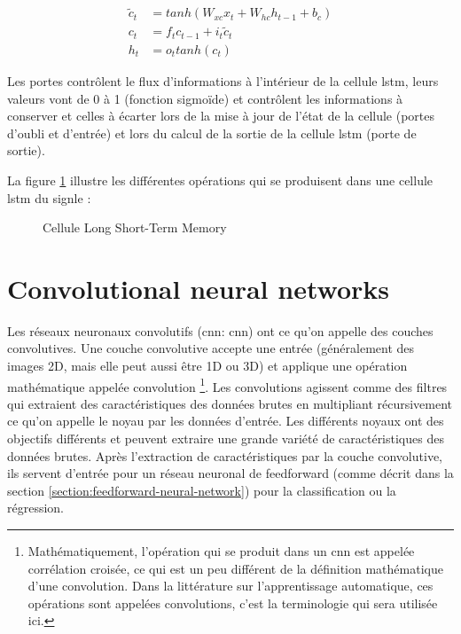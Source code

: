 \begin{align}
    \tilde{c}_t &= tanh(W_{xc}x_t+W_{hc}h_{t-1}+b_c) \label{equation:lstm_candidate_cell_state} \\
    c_t &= f_tc_{t-1}+i_t\tilde{c}_t \label{equation:lstm_cell_state}\\
    h_t &= o_ttanh(c_t) \label{equation:lstm_hidden_state}
\end{align}

Les portes contrôlent le flux d'informations à l'intérieur de la cellule \acrshort{lstm}, leurs valeurs vont de 0 à 1 (fonction sigmoïde) et contrôlent les informations à conserver et celles à écarter lors de la mise à jour de l'état de la cellule (portes d'oubli et d'entrée) et lors du calcul de la sortie de la cellule \acrshort{lstm} (porte de sortie).

La figure \ref{fig:lstm} illustre les différentes opérations qui se produisent dans une cellule \acrshort{lstm} du signle :

\begin{figure}[h]
    \centering
    
    \caption{Cellule Long Short-Term Memory}
    \label{fig:lstm}
\end{figure}

\section{Convolutional neural networks}
\label{section:cnn}
Les réseaux neuronaux convolutifs (\acrlong{cnn}: \acrshort{cnn}) ont ce qu'on appelle des couches convolutives. Une couche convolutive accepte une entrée (généralement des images 2D, mais elle peut aussi être 1D ou 3D) et applique une opération mathématique appelée convolution \footnote{Mathématiquement, l'opération qui se produit dans un \acrshort{cnn} est appelée corrélation croisée, ce qui est un peu différent de la définition mathématique d'une convolution. Dans la littérature sur l'apprentissage automatique, ces opérations sont appelées convolutions, c'est la terminologie qui sera utilisée ici.}. Les convolutions agissent comme des filtres qui extraient des caractéristiques des données brutes en multipliant récursivement ce qu'on appelle le noyau par les données d'entrée.
Les différents noyaux ont des objectifs différents et peuvent extraire une grande variété de caractéristiques des données brutes. Après l'extraction de caractéristiques par la couche convolutive, ils servent d'entrée pour un réseau neuronal de feedforward (comme décrit dans la section \ref{section:feedforward-neural-network}) pour la classification ou la régression.



